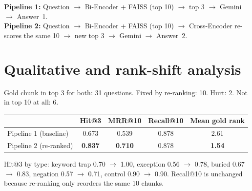 \documentclass[11pt,a4paper]{article}
\newcommand{\ra}{$\rightarrow$}
\begin{document}
\textbf{Pipeline 1:} Question \ra{} Bi-Encoder + FAISS (top 10) \ra{} top 3 \ra{} Gemini \ra{} Answer~1.\\
\textbf{Pipeline 2:} Question \ra{} Bi-Encoder + FAISS (top 10) \ra{} Cross-Encoder re-scores the same 10 \ra{} new top 3 \ra{} Gemini \ra{} Answer~2.

\section{Qualitative and rank-shift analysis}
Gold chunk in top 3 for both: 31 questions. Fixed by re-ranking: 10. Hurt: 2. Not in top 10 at all: 6.

\begin{center}
\small
\begin{tabular}{lcccc}
\toprule
 & Hit@3 & MRR@10 & Recall@10 & Mean gold rank \\
\midrule
Pipeline 1 (baseline)  & 0.673 & 0.539 & 0.878 & 2.61 \\
Pipeline 2 (re-ranked) & \textbf{0.837} & \textbf{0.710} & 0.878 & \textbf{1.54} \\
\bottomrule
\end{tabular}
\end{center}

Hit@3 by type: keyword trap 0.70 \ra{} 1.00, exception 0.56 \ra{} 0.78, buried 0.67 \ra{} 0.83, negation 0.57 \ra{} 0.71, control 0.90 \ra{} 0.90. Recall@10 is unchanged because re-ranking only reorders the same 10 chunks.
\end{document}
